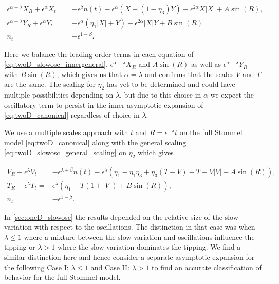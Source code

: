 \begin{equation}\label{eq:twoD_slowosc_innergeneral}
\begin{aligned}
\epsilon^{\alpha-\lambda} X_R+\epsilon^{\alpha}X_t=& -\epsilon^{\beta}n(t)-\epsilon^{\alpha}(X+(1-\eta_3)Y)-\epsilon^{2\alpha}X|X|+A\sin(R),\\
\epsilon^{\alpha-\lambda}Y_R + \epsilon^{\alpha}Y_t =&- \epsilon^\alpha(\eta_1|X|+Y)-\epsilon^{2\alpha}|X|Y +B\sin(R)\\
n_t=&-\epsilon^{1-\beta}.
\end{aligned}
\end{equation}

Here we balance the leading order terms in each equation of \eqref{eq:twoD_slowosc_innergeneral}, $\epsilon^{\alpha-\lambda}X_R$ and $A\sin(R)$ as well as $\epsilon^{\alpha-\lambda}Y_R$ with $B\sin(R)$, which gives us that $\alpha=\lambda$ and confirms that the scales $V$ and $T$ are the same. The scaling for $\eta_2$ has yet to be determined and could have multiple possibilities depending on $\lambda$, but due to this choice in $\alpha$ we expect the oscillatory term to persist in the inner asymptotic expansion of \eqref{eq:twoD_canonical} regardless of choice in $\lambda$.

We use a multiple scales approach with $t$ and $R=\epsilon^{-\lambda}t$ on the full Stommel model \eqref{eq:twoD_canonical} along with the general scaling \eqref{eq:twoD_slowosc_general_scaling} on $\eta_2$ which gives

\begin{equation}\label{eq:twoD_slowosc_general_outermulti}
\begin{aligned}
V_R+\epsilon^{\lambda}V_t =& -\epsilon^{\lambda+\beta}n(t)-\epsilon^{\lambda}(\eta_1-\eta_1\eta_3+\eta_3(T-V)-T-V|V|+A\sin(R)),\\
T_R+\epsilon^{\lambda}T_t =& \epsilon^\lambda(\eta_1-T(1+|V|)+B\sin(R)),\\
n_t =&-\epsilon^{1-\beta}.
\end{aligned}
\end{equation}

In \autoref{sec:oneD_slowosc} the results depended on the relative size of the slow variation with respect to the oscillations. The distinction in that case was when $\lambda\le1$ where a mixture between the slow variation and oscillations influence the tipping or $\lambda>1$ where the slow variation dominates the tipping. We find a similar distinction here and hence consider a separate asymptotic expansion for the following Case I: $\lambda\le 1$ and Case II: $\lambda >1$ to find an accurate classification of behavior for the full Stommel model.

